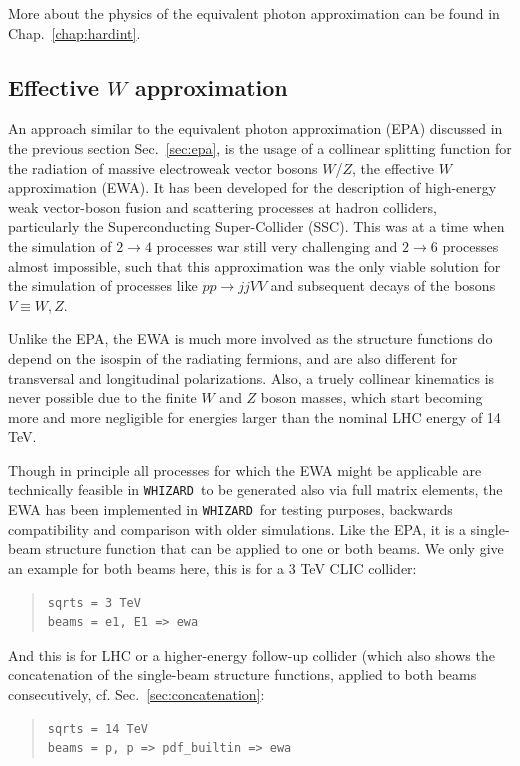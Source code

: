 \documentclass[12pt]{book}
\newcommand{\ttt}[1]{\texttt{#1}}
\newcommand{\whizard}{\ttt{WHIZARD}}
\begin{document}
More about the physics of the equivalent photon approximation can be
found in Chap.~\ref{chap:hardint}.


\subsection{Effective $W$ approximation}
\label{sec:ewa}

An approach similar to the equivalent photon approximation (EPA)
discussed in the previous section Sec.~\ref{sec:epa}, is the usage
of a collinear splitting function for the radiation of massive
electroweak vector bosons $W$/$Z$, the effective $W$ approximation
(EWA). It has been developed for the
description of high-energy weak vector-boson fusion and scattering
processes at hadron colliders, particularly the Superconducting
Super-Collider (SSC). This was at a time when the simulation of $2\to
4$ processes war still very challenging and $2\to 6$ processes almost
impossible, such that this approximation was the only viable solution
for the simulation of processes like $pp \to jjVV$ and subsequent
decays of the bosons $V \equiv W, Z$.

Unlike the EPA, the EWA is much more involved as the structure
functions do depend on the isospin of the radiating fermions, and are
also different for transversal and longitudinal polarizations. Also, a
truely collinear kinematics is never possible due to the finite $W$
and $Z$ boson masses, which start becoming more and more negligible
for energies larger than the nominal LHC energy of 14 TeV.

Though in principle all processes for which the EWA might be
applicable are technically feasible in \whizard\ to be generated also
via full matrix elements, the EWA has been implemented in \whizard\
for testing purposes, backwards compatibility and comparison with
older simulations. Like the EPA, it is a single-beam structure
function that can be applied to one or both beams. We only give an
example for both beams here, this is for a 3 TeV CLIC collider:
\begin{quote}
\begin{footnotesize}
\begin{Verbatim}
sqrts = 3 TeV
beams = e1, E1 => ewa
\end{Verbatim}
\end{footnotesize}
\end{quote}
And this is for LHC or a higher-energy follow-up collider (which also
shows the concatenation of the single-beam structure functions,
applied to both beams consecutively,
cf. Sec.~\ref{sec:concatenation}:
\begin{quote}
\begin{footnotesize}
\begin{Verbatim}
sqrts = 14 TeV
beams = p, p => pdf_builtin => ewa
\end{Verbatim}
\end{footnotesize}
\end{quote}
\end{document}
